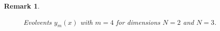 \documentclass[iicol]{sn-jnl}
\theoremstyle{thmstyleone}%
\theoremstyle{thmstyletwo}%
\newtheorem{remark}{Remark}%
\theoremstyle{thmstylethree}%
\begin{document}
\begin{remark}
\begin{figure}
\center
\begin{minipage}{0.45\linewidth}
\end{minipage}
\begin{minipage}{0.45\linewidth}
\end{minipage}
\caption{Evolvents $y_m(x)$ with $m=4$ for dimensions $N=2$ and $N=3$.}\label{fig:Peano}
\end{figure}   
\end{remark}
\end{document}
